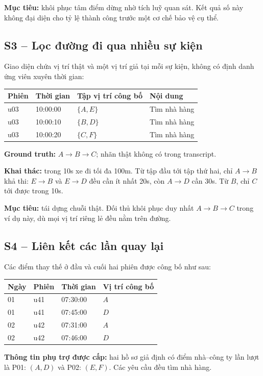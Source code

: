 \textbf{Mục tiêu:} khôi phục tâm điểm dừng nhờ tích luỹ quan sát. Kết quả số này không đại diện cho tỷ lệ thành công trước một cơ chế bảo vệ cụ thể.

\clearpage
\subsection{S3 -- Lọc đường đi qua nhiều sự kiện}
\label{example:s3}

Giao diện chứa vị trí thật và một vị trí giả tại mỗi sự kiện, không có định danh ứng viên xuyên thời gian:
\begin{center}\small
\begin{tabular}{llll}
\toprule
Phiên & Thời gian & Tập vị trí công bố & Nội dung\\
\midrule
u03 & 10:00:00 & $\{A,E\}$ & Tìm nhà hàng\\
u03 & 10:00:10 & $\{B,D\}$ & Tìm nhà hàng\\
u03 & 10:00:20 & $\{C,F\}$ & Tìm nhà hàng\\
\bottomrule
\end{tabular}
\end{center}
\textbf{Ground truth:} $A\rightarrow B\rightarrow C$; nhãn thật không có trong transcript.

\textbf{Khai thác:} trong 10s xe đi tối đa 100m. Từ tập đầu tới tập thứ hai, chỉ $A\rightarrow B$ khả thi: $E\rightarrow B$ và $E\rightarrow D$ đều cần ít nhất 20s, còn $A\rightarrow D$ cần 30s. Từ $B$, chỉ $C$ tới được trong 10s.

\textbf{Mục tiêu:} tái dựng chuỗi thật. Đối thủ khôi phục duy nhất $A\rightarrow B\rightarrow C$ trong ví dụ này, dù mọi vị trí riêng lẻ đều nằm trên đường.

\clearpage
\subsection{S4 -- Liên kết các lần quay lại}
\label{example:s4}

Các điểm thay thế ở đầu và cuối hai phiên được công bố như sau:
\begin{center}\small
\begin{tabular}{llll}
\toprule
Ngày & Phiên & Thời gian & Vị trí công bố\\
\midrule
01 & u41 & 07:30:00 & $A$\\
01 & u41 & 07:45:00 & $D$\\
02 & u42 & 07:31:00 & $A$\\
02 & u42 & 07:46:00 & $D$\\
\bottomrule
\end{tabular}
\end{center}
\textbf{Thông tin phụ trợ được cấp:} hai hồ sơ giả định có điểm nhà--công ty lần lượt là P01: $(A,D)$ và P02: $(E,F)$. Các yêu cầu đều tìm nhà hàng.

